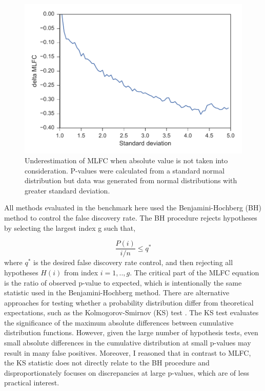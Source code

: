 \begin{figure}
  \centering
  \makeatletter
  \let\@currsize\normalsize
  \includegraphics[width=0.9\linewidth]{figures/chapter4/delta_mlfc.pdf}
  \caption[Effect of absolute value on MLFC]{Underestimation of MLFC when absolute value is not taken into consideration. P-values were calculated from a standard normal distribution but data was generated from normal distributions with greater standard deviation.}
  \label{fig:mlfc_diff}
\end{figure}

All methods evaluated in the benchmark here used the Benjamini-Hochberg (BH) method \cite{RN94} to control the false discovery rate. The BH procedure rejects hypotheses by selecting the largest index g such that,

\begin{equation}
\frac{P(i)}{i/n} \leq q^*
\end{equation}
where $q^*$ is the desired false discovery rate control, and then rejecting all hypotheses $H(i)$ from index $i=1,..,g$. The critical part of the MLFC equation is the ratio of observed p-value to expected, which is intentionally the same statistic used in the Benjamini-Hochberg method. There are alternative approaches for testing whether a probability distribution differ from theoretical expectations, such as the Kolmogorov-Smirnov (KS) test \cite{RN100}. The KS test evaluates the significance of the maximum absolute differences between cumulative distribution functions. However, given the large number of hypothesis tests, even small absolute differences in the cumulative distribution at small p-values may result in many false positives. Moreover, I reasoned that in contrast to MLFC, the KS statistic does not directly relate to the BH procedure and disproportionately focuses on discrepancies at large p-values, which are of less practical interest.

